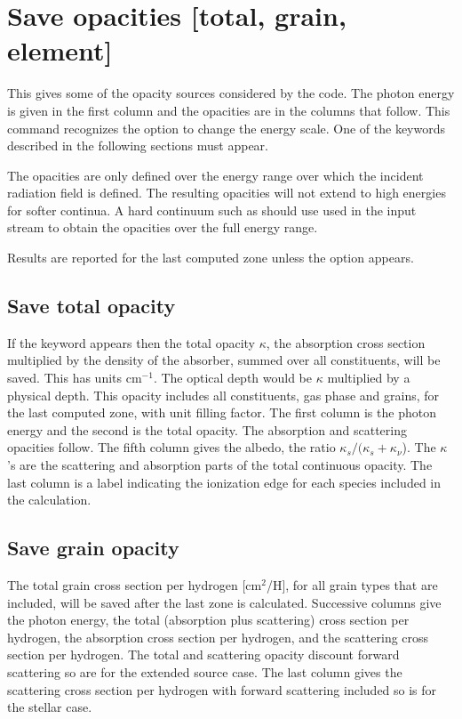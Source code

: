 \section{Save opacities [total, grain, element]}

This gives some of the opacity sources considered by the code. The photon
energy is given in the first column and the opacities are in the columns that
follow. This command recognizes the  option to change the
energy scale. One of the keywords described in the following sections must
appear.

The opacities are only defined over the energy range over which the incident
radiation field is defined. The resulting opacities will not extend to high energies
for softer continua. A hard continuum such as  should use
used in the input stream to obtain the opacities over the full energy range.

Results are reported for the last computed zone unless the  option
appears.

\subsection{Save total opacity}

If the keyword  appears then the total opacity $\kappa$,
the absorption
cross section multiplied by the density of the absorber, summed over all
constituents, will be saved.
This has units cm$^{-1}$.
The optical depth would
be $\kappa $ multiplied by a physical depth.  This opacity includes all constituents,
gas phase and grains, for the last computed zone, with unit filling factor.
The first column is the photon energy and the second is the total opacity.
The absorption and scattering opacities follow.  The fifth column gives
the albedo, the ratio $\kappa _s /( {\kappa _s  + \kappa _\nu  }$).   The
$\kappa $'s are the scattering and absorption parts of the total continuous
opacity.  The last column is a label indicating the ionization edge for
each species included in the calculation.

\subsection{Save grain opacity}

The total grain cross section per hydrogen [cm$^2$/H],
for all grain types that are included, will be
saved after the last zone is calculated.  Successive columns give the
photon energy, the total (absorption plus scattering) cross section per hydrogen, 
the absorption cross section per hydrogen, and the scattering cross section per hydrogen.  The total and scattering opacity
discount forward scattering so are for the extended source case.  The last
column gives the scattering cross section per hydrogen with forward scattering included so
is for the stellar case.

